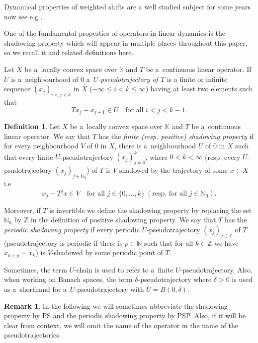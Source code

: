 \documentclass[11pt,a4paper]{amsart}
\theoremstyle{definition}
\newtheorem{definition}[theorem]{Definition}
\newtheorem{remark}[theorem]{Remark}
\newcommand{\Z}{\mathbb{Z}}
\newcommand{\N}{\mathbb{N}}
\newcommand{\K}{\mathbb{K}}
\begin{document}
	Dynamical properties of weighted shifts are a well studied subject for some years now see e.g \cite{Two_problems_for_weighted_shifts_in_linear_dynamics, Dynamics_of_shift_operators_on_non-metrizable_sequence_spaces, Hyperc_chaotic_weight_shifts, Chaos_for_backward_shift_operators, Dynamics_of_shift_operators, Hypercyclic_weighted_shifts}.
	
	One of the fundamental properties of operators in linear dynamics is the shadowing property which will appear in multiple places throughout this paper, so we recall it and related definitions here. 
	
	Let \(X\) be a~locally convex space over \(\K\) and \(T\) be a~continuous linear operator. If \(U\) is a~neighbourhood of \(0\) a~\emph{\(U\)-pseudotrajectory of \(T\)} is a finite or infinite sequence \((x_j)_{i<j<k}\) in \(X\) (\( - \infty \leq i < k \leq \infty\)) having at least two elements such that 
	\[T x_j - x_{j+1} \in U \quad \text{for all } i < j < k-1.\]
	\begin{definition}
		Let \(X\) be a~locally convex space over \(\K\) and \(T\) be a~continuous linear operator.
		We say that \(T\) has the \emph{finite (resp. positive) shadowing property} if for every neighbourhood \(V\) of \(0\) in \(X\), there is a~neighbourhood \(U\) of \(0\) in \(X\) such that every finite \(U\)-pseudotrajectory \((x_j)_{j=0}^{k}\), where \(0<k < \infty\) (resp. every \(U\)-psudotrajectory \((x_j)_{j \in \N_0}\)) of \(T\) is \(V\)-shadowed by the trajectory of some \(x \in X\) i.e 
		\[x_j - T^j x  \in V \quad \text{for all } j \in \{0, \dots, k\}\ (\text{resp. for all } j \in \N_0).\]
		
		Moreover, if \(T\) is invertible we define the shadowing property by replacing the set \(\N_0\) by \(\Z\) in the definition of positive shadowing property. We say that \(T\) has the \emph{periodic shadowing property} if every periodic \(U\)-pseudotrajectory \((x_j)_{j \in \Z}\) of \(T\) (pseudotrajectory is periodic if there is \(p \in \N\) such that for all \(k \in \Z\) we have \(x_{k+p} = x_{k}\)) is \(V\)-shadowed by some periodic point of \(T\).
	\end{definition}
	Sometimes, the term $U$-chain is used to refer to a~finite $U$-pseudotrajectory. Also, when working on Banach spaces, the term $\delta$-pseudotrajectory where $\delta > 0$ is used as a~shorthand for a~$U$-pseudotrajectory with $U = B(0, \delta)$.
	\begin{remark}
		In the following we will sometimes abbreviate the shadowing property by PS and the periodic shadowing property by PSP. Also, if it will be clear from context, we will omit the name of the operator in the name of the pseudotrajectories.
	\end{remark}
	
\end{document}
